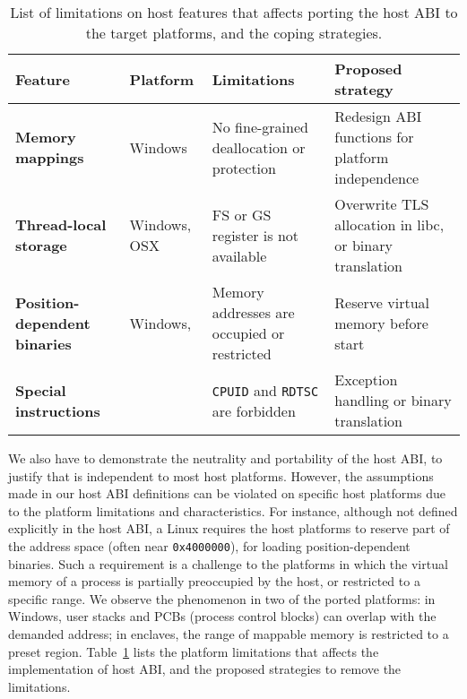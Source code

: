 \begin{table}[t]
\footnotesize
\centering
\begin{tabular}{>{\bf}p{1.2in}>{\raggedright\arraybackslash}p{0.8in}>{\raggedright\arraybackslash}p{1.6in}>{\raggedright\arraybackslash}p{2.2in}}
\toprule
{\bf Feature} & {\bf Platform} & {\bf Limitations} & {\bf Proposed strategy} \\
\midrule
Memory mappings & Windows & No fine-grained deallocation or protection & Redesign ABI functions for platform independence \\
\midrule
Thread-local storage & Windows, OSX & FS or GS register is not available & Overwrite TLS allocation in libc, or binary translation \\
\midrule
Position-dependent binaries & Windows, \sgx{} & Memory addresses are occupied or restricted & Reserve virtual memory before \picoprocs{} start \\
\midrule
Special instructions & \sgx{} & {\tt CPUID} and {\tt RDTSC} are forbidden & Exception handling or binary translation \\
\bottomrule
\end{tabular}
\caption[List of platform limitations affecting host ABI porting]
{List of limitations on host features that affects porting the host ABI to the target platforms,
and the coping strategies.}
\label{tab:future:abi-limit}
\end{table}

We also have to demonstrate the neutrality and portability of the host ABI,
to justify that \graphene{} is independent to most host platforms.
However, the assumptions made in our host ABI definitions
can be violated on specific host platforms
due to the platform limitations and characteristics.
For instance, although not defined explicitly in the host ABI,
a Linux \picoprocs{} requires the host platforms
to reserve part of the address space (often near {\tt 0x4000000}), for loading position-dependent binaries.
Such a requirement is a challenge to the platforms
in which the virtual memory of a process is partially preoccupied by the host,
or restricted to a specific range.
We observe the phenomenon in two of the ported platforms:
in Windows, user stacks and PCBs (process control blocks) can overlap with the demanded address;
in \sgx{} enclaves, the range of mappable memory is
restricted to a preset region.
Table~\ref{tab:future:abi-limit}
lists the platform limitations that affects the implementation of host ABI,
and the proposed strategies to remove the limitations.


